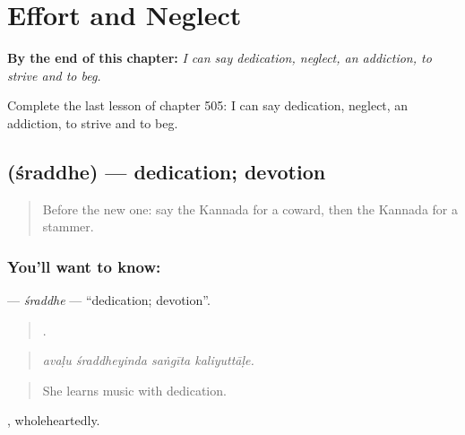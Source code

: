 
\chapter{Effort and Neglect}
\label{ch:ka-effort-and-neglect}

\begin{chapteropening}
\textbf{By the end of this chapter:} \emph{I can say dedication, neglect, an addiction, to strive and to beg.}

Complete the last lesson of chapter 505: I can say dedication, neglect, an addiction, to strive and to beg.
\end{chapteropening}

\section[\texorpdfstring{\kn{ಶ್ರದ್ಧೆ} (śraddhe)}{ಶ್ರದ್ಧೆ (śraddhe)}]{ (śraddhe) — dedication; devotion}

\label{lesson:KA-C505-sraddhe}



\begin{quote}
Before the new one: say the Kannada for a coward, then the Kannada for a stammer.
\end{quote}

\subsection*{You'll want to know: }
\textbf{} — \emph{śraddhe} — \textquotedblleft{}dedication; devotion\textquotedblright{}.

\begin{quote}
   .
\end{quote}

\begin{quote}
\emph{avaḷu śraddheyinda saṅgīta kaliyuttāḷe.}
\end{quote}

\begin{quote}
She learns music with dedication.
\end{quote}

, wholeheartedly.

